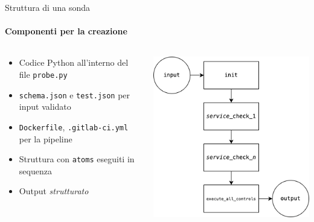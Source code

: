 \documentclass{beamer}
\begin{document}
\begin{frame}{Struttura di una sonda}
    \framesubtitle{Componenti per la creazione}
    \begin{columns}
        \begin{column}{0.6\textwidth}
            \begin{itemize}
                \item Codice Python all'interno del file \texttt{probe.py}
                \item \texttt{schema.json} e \texttt{test.json} per input validato
                \item \texttt{Dockerfile}, \texttt{.gitlab-ci.yml} per la pipeline
                \item Struttura con \texttt{atoms} eseguiti in sequenza
                \item Output \emph{strutturato}
            \end{itemize}
        \end{column}
        \begin{column}{0.4\textwidth}
            \includegraphics[width=\textwidth]{assets/flow.drawio.png}
        \end{column}
    \end{columns}
\end{frame}
\end{document}

